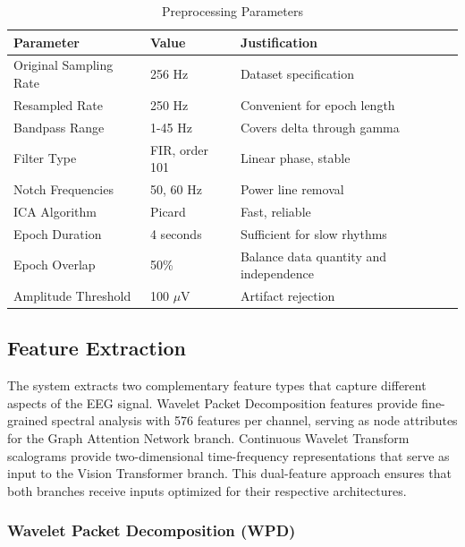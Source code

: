 \begin{table}[H]
    \centering
    \small
    \caption{Preprocessing Parameters}
    \label{tab:preprocessing_params}
    \begin{tabularx}{\textwidth}{|L{3.5cm}|L{2.5cm}|X|}
        \hline
        \textbf{Parameter} & \textbf{Value} & \textbf{Justification} \\
        \hline
        Original Sampling Rate & 256 Hz & Dataset specification \\
        \hline
        Resampled Rate & 250 Hz & Convenient for epoch length \\
        \hline
        Bandpass Range & 1-45 Hz & Covers delta through gamma \\
        \hline
        Filter Type & FIR, order 101 & Linear phase, stable \\
        \hline
        Notch Frequencies & 50, 60 Hz & Power line removal \\
        \hline
        ICA Algorithm & Picard & Fast, reliable \\
        \hline
        Epoch Duration & 4 seconds & Sufficient for slow rhythms \\
        \hline
        Epoch Overlap & 50\% & Balance data quantity and independence \\
        \hline
        Amplitude Threshold & 100 $\mu$V & Artifact rejection \\
        \hline
    \end{tabularx}
\end{table}

\subsection{Feature Extraction}

The system extracts two complementary feature types that capture different aspects of the EEG signal. Wavelet Packet Decomposition features provide fine-grained spectral analysis with 576 features per channel, serving as node attributes for the Graph Attention Network branch. Continuous Wavelet Transform scalograms provide two-dimensional time-frequency representations that serve as input to the Vision Transformer branch. This dual-feature approach ensures that both branches receive inputs optimized for their respective architectures.

\subsubsection{Wavelet Packet Decomposition (WPD)}

